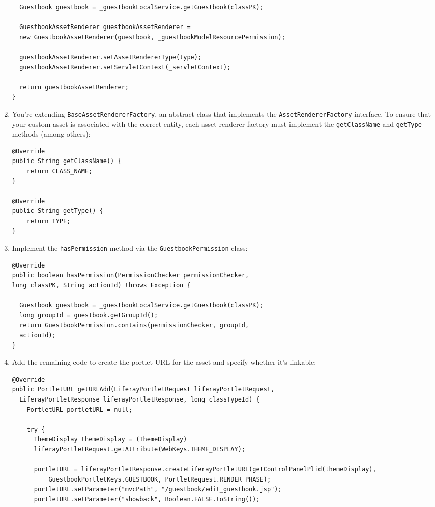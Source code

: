 \begin{enumerate}
\begin{verbatim}
  Guestbook guestbook = _guestbookLocalService.getGuestbook(classPK);

  GuestbookAssetRenderer guestbookAssetRenderer = 
  new GuestbookAssetRenderer(guestbook, _guestbookModelResourcePermission);

  guestbookAssetRenderer.setAssetRendererType(type);
  guestbookAssetRenderer.setServletContext(_servletContext);

  return guestbookAssetRenderer;
}
\end{verbatim}
\item
  You're extending \texttt{BaseAssetRendererFactory}, an abstract class
  that implements the \texttt{AssetRendererFactory} interface. To ensure
  that your custom asset is associated with the correct entity, each
  asset renderer factory must implement the \texttt{getClassName} and
  \texttt{getType} methods (among others):

\begin{verbatim}
@Override
public String getClassName() {
    return CLASS_NAME;
}

@Override
public String getType() {
    return TYPE;
}
\end{verbatim}
\item
  Implement the \texttt{hasPermission} method via the
  \texttt{GuestbookPermission} class:

\begin{verbatim}
@Override
public boolean hasPermission(PermissionChecker permissionChecker, 
long classPK, String actionId) throws Exception {

  Guestbook guestbook = _guestbookLocalService.getGuestbook(classPK);
  long groupId = guestbook.getGroupId();
  return GuestbookPermission.contains(permissionChecker, groupId, 
  actionId);
}
\end{verbatim}
\item
  Add the remaining code to create the portlet URL for the asset and
  specify whether it's linkable:

\begin{verbatim}
@Override
public PortletURL getURLAdd(LiferayPortletRequest liferayPortletRequest,
  LiferayPortletResponse liferayPortletResponse, long classTypeId) {
    PortletURL portletURL = null;

    try {
      ThemeDisplay themeDisplay = (ThemeDisplay) 
      liferayPortletRequest.getAttribute(WebKeys.THEME_DISPLAY);

      portletURL = liferayPortletResponse.createLiferayPortletURL(getControlPanelPlid(themeDisplay),
          GuestbookPortletKeys.GUESTBOOK, PortletRequest.RENDER_PHASE);
      portletURL.setParameter("mvcPath", "/guestbook/edit_guestbook.jsp");
      portletURL.setParameter("showback", Boolean.FALSE.toString());


\end{verbatim}
\end{enumerate}
